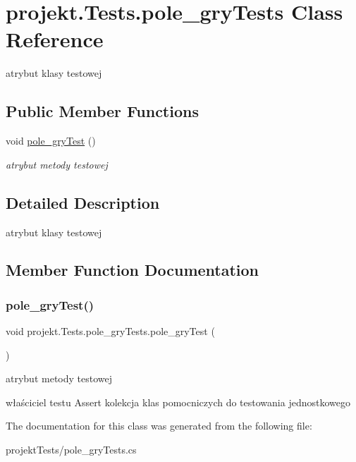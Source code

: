 \hypertarget{classprojekt_1_1_tests_1_1pole__gry_tests}{}\section{projekt.\+Tests.\+pole\+\_\+gry\+Tests Class Reference}
\label{classprojekt_1_1_tests_1_1pole__gry_tests}


atrybut klasy testowej  


\subsection*{Public Member Functions}
\begin{DoxyCompactItemize}
\item 
void \mbox{\hyperlink{classprojekt_1_1_tests_1_1pole__gry_tests_a5e2724c36fd3b28d160ff4d0b587f737}{pole\+\_\+gry\+Test}} ()
\begin{DoxyCompactList}\small\item\em atrybut metody testowej \end{DoxyCompactList}\end{DoxyCompactItemize}


\subsection{Detailed Description}
atrybut klasy testowej 

\subsection{Member Function Documentation}
\mbox{\label{classprojekt_1_1_tests_1_1pole__gry_tests_a5e2724c36fd3b28d160ff4d0b587f737}} 
\subsubsection{\texorpdfstring{pole\+\_\+gry\+Test()}{pole\_gryTest()}}
{\footnotesize\ttfamily void projekt.\+Tests.\+pole\+\_\+gry\+Tests.\+pole\+\_\+gry\+Test (\begin{DoxyParamCaption}{ }\end{DoxyParamCaption})\hspace{0.3cm}{\ttfamily [inline]}}



atrybut metody testowej 

właściciel testu Assert kolekcja klas pomocniczych do testowania jednostkowego 

The documentation for this class was generated from the following file\+:\begin{DoxyCompactItemize}
\item 
projekt\+Tests/pole\+\_\+gry\+Tests.\+cs\end{DoxyCompactItemize}
